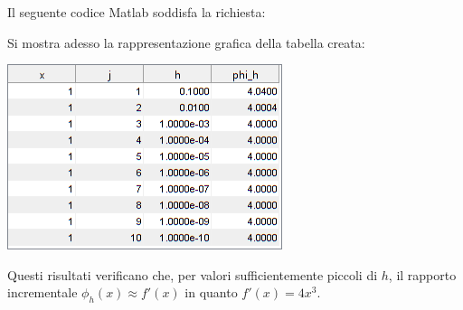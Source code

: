 \begin{center}
\footnotesize\noindent{}\end{center}

\noindent Il seguente codice Matlab soddisfa la richiesta:


\noindent Si mostra adesso la rappresentazione grafica della tabella creata:
\begin{center}
	\includegraphics[scale=1]{cap1/es3.png}
\end{center}

\noindent Questi risultati verificano che, per valori sufficientemente piccoli di \(h\), il rapporto incrementale \(\phi_h(x) \approx f'(x)\) in quanto \(f'(x) = 4x^3\).
